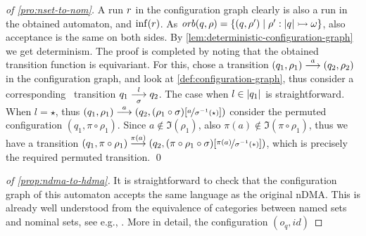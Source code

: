 \begin{proof}[of \cref{pro:nset-to-nom}]
 A run $r$ in the configuration graph clearly is also a run in the obtained automaton, and $\inf(r)$. As $\mathit{orb}(q,\rho) = \{(q,\rho')\mid \rho' : |q| \rightarrowtail \omega \}$, also acceptance is the same on both sides. By \cref{lem:deterministic-configuration-graph} we get determinism. The proof is completed by noting that the obtained transition function is equivariant. For this, chose a transition $(q_1,\rho_1) \overset{a}{\longrightarrow} (q_2,\rho_2)$ in the configuration graph, and look at \cref{def:configuration-graph}, thus consider a corresponding \hdma\ transition $q_1 \overset{l}{\underset{\sigma}{\longrightarrow}} q_2$. The case when $l \in |q_1|$ is straightforward. When $l=\star$, thus $(q_1,\rho_1) \overset{a}{\longrightarrow} (q_2,(\rho_1 \circ \sigma)[\nicefrac{a}{\sigma^{-1}(\star)}])$ consider the permuted configuration $(q_1,\pi\circ\rho_1)$. Since $a \notin \Im(\rho_1)$, also  $\pi(a) \notin \Im (\pi\circ\rho_1)$, thus we have a transition $(q_1,\pi\circ\rho_1)\overset{\pi(a)}{\longrightarrow}(q_2,(\pi \circ \rho_1\circ \sigma)[\nicefrac{\pi(a)}{\sigma^{-1}(*)}])$, which is precisely the required permuted transition. \qed
\end{proof}

 
\begin{proof}[of \cref{prop:ndma-to-hdma}]
 It is straightforward to check that the configuration graph of this automaton accepts the same language as the original nDMA. This is already well understood from the equivalence of categories between named sets and nominal sets, see e.g., \cite{GadducciMM06}. More in detail, the configuration $(o_q,id)$
\end{proof}


